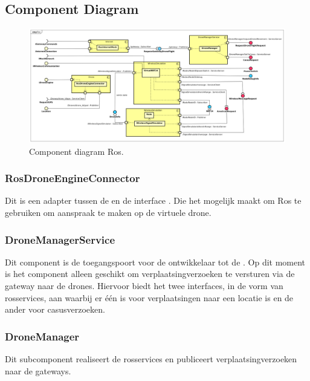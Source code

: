 \documentclass[a4paper, 11pt, oneside]{report}
\begin{document}
\subsection{Component Diagram}
\label{DetailedDesign:ros:ComponentDiagram}
\begin{figure}[H]
	\begin{center}\includegraphics[width=\linewidth]{Afbeeldingen/rosComponentDiagram.png}\end{center}
	\caption{Component diagram Ros.}
	\label{fig:component:ros}
\end{figure}

\subsubsection{RosDroneEngineConnector}
\label{architectural:subcomponenten:RosDroneEngineConnector}
Dit is een adapter tussen de  en de interface . Die het mogelijk maakt om Ros te gebruiken om aanspraak te maken op de virtuele drone.

\subsubsection{DroneManagerService}
\label{architectural:subcomponenten:DroneManagerService}
Dit component is de toegangspoort voor de ontwikkelaar tot de .
Op dit moment is het component alleen geschikt om verplaatsingverzoeken te versturen via de gateway naar de drones.
Hiervoor biedt het twee interfaces, in de vorm van rosservices, aan waarbij er één is voor verplaatsingen naar een locatie is en de ander voor casusverzoeken. 

\subsubsection{DroneManager}
\label{architectural:subcomponenten:DroneManager}
Dit subcomponent realiseert de rosservices en publiceert verplaatsingverzoeken naar de gateways.  
\end{document}
